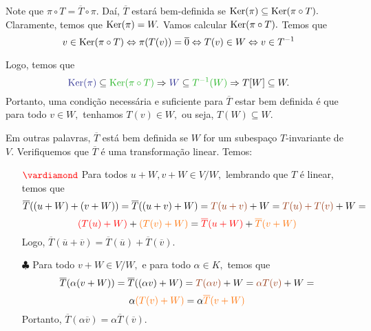 \documentclass[11pt,a4paper]{article}
\begin{document}
{{\begin{center}

\end{center}
Note que $\pi \circ T = \overline{T} \circ \pi.$ Daí, $\overline{T}$ estará bem-definida se ${\rm Ker}(\pi) \subseteq {\rm Ker}(\pi \circ T).$ Claramente, temos que ${\rm Ker}(\pi) = W.$ Vamos calcular $ {\rm Ker}(\pi \circ T).$ Temos que
\[v \in {\rm Ker}(\pi \circ T) \Leftrightarrow  \pi ( T(v)) = \overline{0} \Leftrightarrow T(v) \in W \Leftrightarrow v \in T^{-1}\]

Logo, temos que 
\[\textcolor{Blue}{\Ker(\pi)} \subseteq \textcolor{Verde}{\Ker(\pi \circ T)} \Rightarrow \textcolor{Blue}{W} \subseteq \textcolor{Verde}{T^{-1}(W)} \Rightarrow T[W] \subseteq W.\]
Portanto, uma condição necessária e suficiente para $\overline{T}$ estar bem definida é que para todo $v \in W,$ tenhamos $T(v) \in W,$ ou seja, $T(W) \subseteq W.$

Em outras palavras, $\overline{T}$ está bem definida se $W$ for um subespaço $T$-invariante de $V.$
    \task[\pers{b}] Verifiquemos que $\overline{T}$ é uma transformação linear. Temos:
    \begin{itemize}
        \item[$\textcolor{red}{\vardiamond}$] Para todos $u + W, v + W \in V/W,$ lembrando que $T$ é linear, temos que
     \[        \overline{T}((u+W) + (v + W)) = \overline{T}((u+v)+ W) = \textcolor{RawSienna}{T(u+v)} + W = \textcolor{RawSienna}{T(u)+T(v)}+ W = \]\[\textcolor{red}{(T(u) + W)} + \textcolor{Laranja}{(T(v) + W)} = \textcolor{red}{\overline{T}(u+W)} + \textcolor{Laranja}{\overline{T}(v+W)}      \]
        Logo, $\overline{T}(\overline{u}+\overline{v}) = \overline{T}(\overline{u})+ \overline{T}(\overline{v}).$
        
       \item[$\clubsuit$] Para todo $v + W \in V/W,$ e para todo $\alpha \in K,$ temos que
       \[         \overline{T}(\alpha(v+W)) = \overline{T}( (\alpha v)+W) = \textcolor{RawSienna}{T(\alpha v)} + W = \textcolor{RawSienna}{\alpha T(v)} + W =  \]\[ \alpha \textcolor{Laranja}{(T(v) +W)} = \alpha \textcolor{Laranja}{\overline{T}(v + W)}       \]
        Portanto, $\overline{T}(\alpha \overline{v}) = \alpha \overline{T}(\overline{v}).$
    \end{itemize}
    
}}
\end{document}

